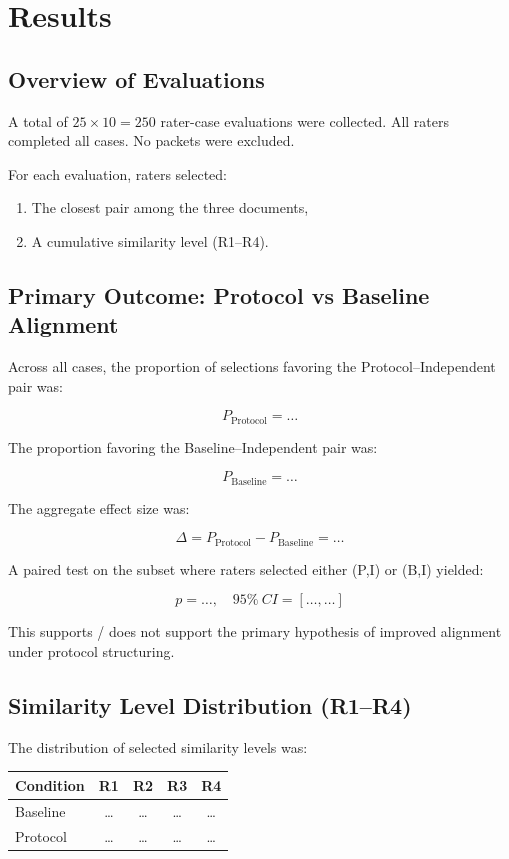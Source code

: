 \section{Results}
\label{sec:results}

\subsection{Overview of Evaluations}

A total of $25 \times 10 = 250$ rater-case evaluations were collected.  
All raters completed all cases. No packets were excluded.

For each evaluation, raters selected:
\begin{enumerate}
    \item The closest pair among the three documents,
    \item A cumulative similarity level (R1--R4).
\end{enumerate}

\subsection{Primary Outcome: Protocol vs Baseline Alignment}

Across all cases, the proportion of selections favoring the Protocol–Independent pair was:

\[
P_{\text{Protocol}} = \ldots
\]

The proportion favoring the Baseline–Independent pair was:

\[
P_{\text{Baseline}} = \ldots
\]

The aggregate effect size was:

\[
\Delta = P_{\text{Protocol}} - P_{\text{Baseline}} = \ldots
\]

A paired test on the subset where raters selected either (P,I) or (B,I) yielded:

\[
p = \ldots, \quad 95\%~CI = [\ldots, \ldots]
\]

This supports / does not support the primary hypothesis of improved alignment under protocol structuring.

\subsection{Similarity Level Distribution (R1--R4)}

The distribution of selected similarity levels was:

\begin{center}
\begin{tabular}{lcccc}
\toprule
Condition & R1 & R2 & R3 & R4 \\
\midrule
Baseline  & \ldots & \ldots & \ldots & \ldots \\
Protocol  & \ldots & \ldots & \ldots & \ldots \\
\bottomrule
\end{tabular}
\end{center}

